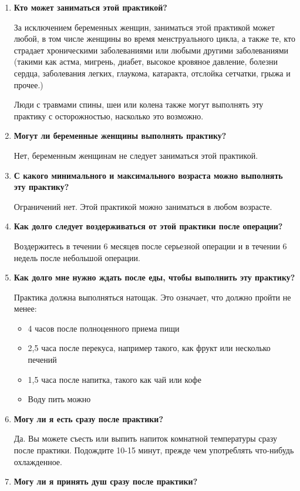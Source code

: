 \documentclass[
a4paper, %
12pt, %
article,
onecolumn, %
openany, %
]{memoir}
\begin{document}
\begin{enumerate}
    \item \textbf{Кто может заниматься этой практикой?}

За исключением беременных женщин, заниматься этой практикой может любой, в том
числе женщины во время менструального цикла, а также те, кто страдает
хроническими заболеваниями или любыми другими заболеваниями (такими как астма,
мигрень, диабет, высокое кровяное давление, болезни сердца, заболевания легких,
глаукома, катаракта, отслойка сетчатки, грыжа и прочее.)

Люди с травмами спины, шеи или колена также могут выполнять эту практику с
осторожностью, насколько это возможно.
\item \textbf{Могут ли беременные женщины выполнять практику?}

Нет, беременным женщинам не следует заниматься этой практикой.
\item \textbf{С какого минимального и максимального возраста можно выполнять эту практику?}

Ограничений нет. Этой практикой можно заниматься в любом возрасте.
\item \textbf{Как долго следует воздерживаться от этой практики после операции?}

Воздержитесь в течении 6 месяцев после серьезной операции и в течении 6 недель
после небольшой операции.


\item \textbf{Как долго мне нужно ждать после еды, чтобы выполнить эту практику?}

Практика должна выполняться натощак.
Это означает, что должно пройти не менее:
\begin{itemize}
\item 4 часов после полноценного приема пищи
\item 2,5 часа после перекуса, например такого, как фрукт или несколько печений
\item 1,5 часа после напитка, такого как чай или кофе
\item Воду пить можно
\end{itemize}

\item \textbf{Могу ли я есть сразу после практики?}

Да. Вы можете съесть или выпить напиток комнатной температуры сразу после
практики. Подождите 10-15 минут, прежде чем употреблять что-нибудь охлажденное.
\item \textbf{Могу ли я принять душ сразу после практики?}


\end{enumerate}
\end{document}
